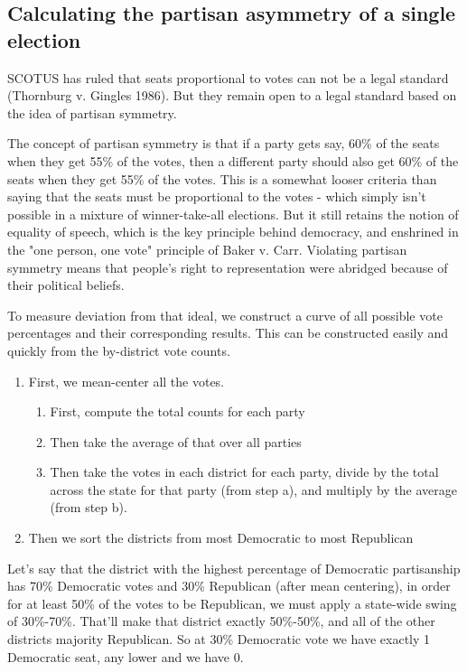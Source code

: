 \documentclass[preprint,12pt]{article}
\begin{document}
\subsection{Calculating the partisan asymmetry of a single election}
 
SCOTUS has ruled that seats proportional to votes can not be a legal standard (Thornburg v. Gingles 1986).   But they remain open to a legal standard based on the idea of partisan symmetry.
 
The concept of partisan symmetry is that if a party gets say, 60\% of the seats when they get 55\% of the votes, then a different party should also get 60\% of the seats when they get 55\% of the votes.  This is a somewhat looser criteria than saying that the seats must be proportional to the votes - which simply isn't possible in a mixture of winner-take-all elections.  But it still retains the notion of equality of speech, which is the key principle behind democracy, and enshrined in the "one person, one vote" principle of Baker v. Carr.  Violating partisan symmetry means that people's right to representation were abridged because of their political beliefs.
 
To measure deviation from that ideal, we construct a curve of all possible vote percentages and their corresponding results.  This can be constructed easily and quickly from the by-district vote counts.

\begin{enumerate}

\item First, we mean-center all the votes.
\begin{enumerate}
\item First, compute the total counts for each party
\item Then take the average of that over all parties
\item Then take the votes in each district for each party, divide by the total across the state for that party (from step a), and multiply by the average (from step b).
\end{enumerate}
\item Then we sort the districts from most Democratic to most Republican

\end{enumerate}

Let's say that the district with the highest percentage of Democratic partisanship has 70\% Democratic votes and 30\% Republican (after mean centering), in order for at least 50\% of the votes to be Republican, we must apply a state-wide swing of 30\%-70\%.  That'll make that district exactly 50\%-50\%, and all of the other districts majority Republican.  So at 30\% Democratic vote we have exactly 1 Democratic seat, any lower and we have 0.
 
\end{document}
